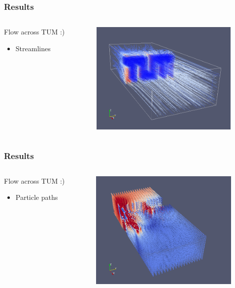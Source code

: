 \documentclass{beamer}
\begin{document}
\begin{frame}
\frametitle{Results}
\begin{columns}
\begin{column}{0.33\textwidth}
Flow across TUM :)
\begin{itemize}
\item Streamlines
\end{itemize}
\end{column}
\begin{column}{0.66\textwidth}
\includegraphics[height=5.5cm]{TUMFlow.png}
\end{column}
\end{columns}
\end{frame}

\begin{frame}
\frametitle{Results}
\begin{columns}
\begin{column}{0.33\textwidth}
Flow across TUM :)
\begin{itemize}
\item Particle paths
\end{itemize}
\end{column}
\begin{column}{0.66\textwidth}
\includegraphics[height=5.8cm]{TUM-Particles.png}
\end{column}
\end{columns}
\end{frame}
\end{document}
